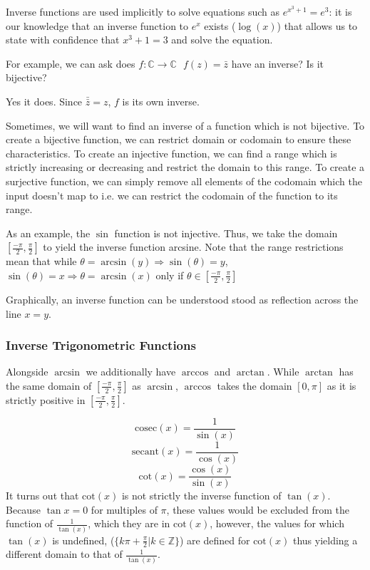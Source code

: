 \documentclass[12pt]{report}
\newcommand{\Z}{\mathbb{Z}}
\newcommand{\C}{\mathbb{C}}
\begin{document}
\begin{flushleft}
\bigskip
Inverse functions are used implicitly to solve equations such as \(e^{x^3 + 1} = e^3\):
it is our knowledge that an inverse function to \(e^x\) exists (\(\log(x)\)) that
allows us to state with confidence that \(x^3 + 1 = 3\) and solve the equation.

For example, we can ask does \(f: \C \rightarrow \C\:\:\:f(z) = \bar{z}\) 
have an inverse? Is it bijective?

\bigskip
Yes it does. Since \(\bar{\bar{z}} = z\), \(f\) is its own inverse.

\bigskip
Sometimes, we will want to find an inverse of a function which is not bijective.
To create a bijective function, we can restrict domain or codomain to ensure these 
characteristics. To create an injective function, we can find a range which is
strictly increasing or decreasing and restrict the domain to this range. To create
a surjective function, we can simply remove all elements of the codomain which the
input doesn't map to i.e. we can restrict the codomain of the function to its range.

\bigskip
As an example, the \(\sin\) function is not injective. Thus, we take the domain
\([\frac{-\pi}{2}, \frac{\pi}{2}]\) to yield the inverse function arcsine. Note that the
range restrictions mean that while \(\theta = \arcsin(y) \Rightarrow \sin(\theta) = y\),
\(\sin(\theta) = x \Rightarrow \theta = \arcsin(x)\) only if \(\theta \in [\frac{-\pi}{2}, \frac{\pi}{2}]\)

\bigskip
Graphically, an inverse function can be understood stood as reflection across the line
\(x = y\).

\subsubsection*{Inverse Trigonometric Functions}
Alongside \(\arcsin\) we additionally have \(\arccos\) and \(\arctan\).
While \(\arctan\) has the same domain of \([\frac{-\pi}{2}, \frac{\pi}{2}]\) as
\(\arcsin\), \(\arccos\) takes the domain \([0, \pi]\) as it is strictly positive
in \([\frac{-\pi}{2}, \frac{\pi}{2}]\).

\[\mathrm{cosec}(x) = \frac{1}{\sin(x)}\]
\[\mathrm{secant}(x) = \frac{1}{\cos(x)}\]
\[\mathrm{cot}(x) = \frac{\cos(x)}{\sin(x)}\]
It turns out that \(\mathrm{cot}(x)\) is not strictly the inverse function of \(\tan(x)\).
Because \(\tan{x} = 0\) for multiples of \(\pi\), these values would be excluded from the function
of \(\frac{1}{\tan(x)}\), which they are in \(\mathrm{cot}(x)\), however, the values for which
\(\tan(x)\) is undefined, (\(\{k\pi + \frac{\pi}{2} | k \in \Z\}\)) are defined 
for \(\mathrm{cot}(x)\) thus yielding a different domain to that of \(\frac{1}{\tan(x)}\).


\end{flushleft}
\end{document}
